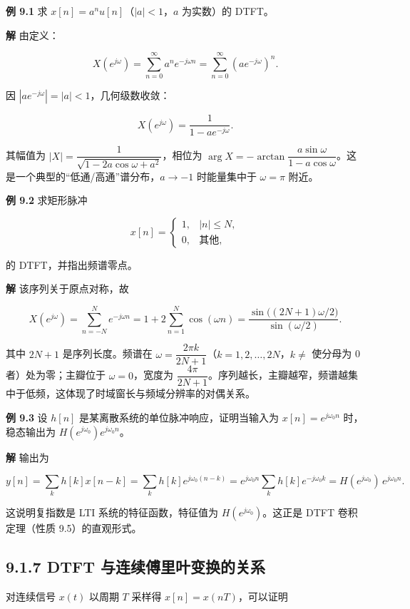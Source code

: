 \textbf{例 9.1} 求 \(x[n]=a^n u[n]\)（\(|a|<1\)，\(a\) 为实数）的 DTFT。

\textbf{解} 由定义：

\[
X(e^{j\omega}) = \sum_{n=0}^{\infty} a^n e^{-j\omega n}
= \sum_{n=0}^{\infty} (a e^{-j\omega})^n .
\]

因 \(|a e^{-j\omega}|=|a|<1\)，几何级数收敛：

\[
X(e^{j\omega}) = \frac{1}{1-a e^{-j\omega}} .
\]

其幅值为 \(|X|=\dfrac{1}{\sqrt{1-2a\cos\omega+a^2}}\)，相位为
\(\arg X=-\arctan\dfrac{a\sin\omega}{1-a\cos\omega}\)。这是一个典型的``低通/高通''谱分布，\(a\to-1\)
时能量集中于 \(\omega=\pi\) 附近。

\textbf{例 9.2} 求矩形脉冲

\[
x[n]=\begin{cases}1,& |n|\le N,\\ 0,& \text{其他},\end{cases}
\]

的 DTFT，并指出频谱零点。

\textbf{解} 该序列关于原点对称，故

\[
X(e^{j\omega}) = \sum_{n=-N}^{N} e^{-j\omega n}
= 1 + 2\sum_{n=1}^{N}\cos(\omega n)
= \frac{\sin\bigl((2N+1)\omega/2\bigr)}{\sin(\omega/2)} .
\]

其中 \(2N+1\) 是序列长度。频谱在
\(\omega = \dfrac{2\pi k}{2N+1}\)（\(k=1,2,\ldots,2N\)，\(k\neq\)
使分母为 0 者）处为零；主瓣位于 \(\omega=0\)，宽度为
\(\dfrac{4\pi}{2N+1}\)。序列越长，主瓣越窄，频谱越集中于低频，这体现了时域窗长与频域分辨率的对偶关系。

\textbf{例 9.3} 设 \(h[n]\) 是某离散系统的单位脉冲响应，证明当输入为
\(x[n]=e^{j\omega_0 n}\) 时，稳态输出为
\(H(e^{j\omega_0})e^{j\omega_0 n}\)。

\textbf{解} 输出为

\[
y[n]=\sum_k h[k] x[n-k] = \sum_k h[k] e^{j\omega_0(n-k)}
= e^{j\omega_0 n}\sum_k h[k] e^{-j\omega_0 k}
= H(e^{j\omega_0})\,e^{j\omega_0 n}.
\]

这说明复指数是 LTI 系统的特征函数，特征值为 \(H(e^{j\omega_0})\)。这正是
DTFT 卷积定理（性质 9.5）的直观形式。

\subsection{9.1.7 DTFT
与连续傅里叶变换的关系}\label{dtft-ux4e0eux8fdeux7eedux5085ux91ccux53f6ux53d8ux6362ux7684ux5173ux7cfb}

对连续信号 \(x(t)\) 以周期 \(T\) 采样得 \(x[n]=x(nT)\)，可以证明

